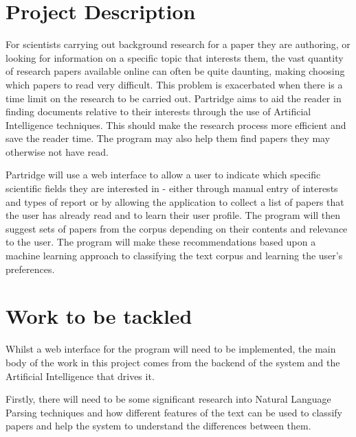 \documentclass[12pt,a4paper]{article}
\begin{document}



\setlength{\parindent}{0pt}
\setlength{\parskip}{1.5ex plus 0.5ex minus 0.2ex}


\pagebreak

\section{Project Description}

For scientists carrying out background research for a paper they are authoring, or looking for 
information on a specific topic that interests them, the vast quantity of
research papers available online can often be quite daunting, making 
choosing which papers to read very difficult. This problem
is exacerbated when there is a time limit on the research to be carried
out. Partridge aims to aid the reader in finding documents relative to their
interests through the use of Artificial Intelligence techniques. This should
make the research process more efficient and save the reader time. The program
may also help them find papers they may otherwise not have read.

Partridge will use a web interface to allow a user to indicate which
specific scientific fields they are interested in - either through manual entry
of interests and types of report or by allowing the application to collect a
list of papers that the user has already read and to learn their user profile.
The program will then suggest sets of papers from the corpus depending on their
contents and relevance to the user. The program will make these recommendations
based upon a machine learning approach to classifying the text corpus and
learning the user's preferences.

\section{Work to be tackled}
Whilst a web interface for the program will need to be implemented, the main
body of the work in this project comes from the backend of the system and the
Artificial Intelligence that drives it.

Firstly, there will need to be some significant research into Natural Language
Parsing techniques and how different features of the text can be used to
classify papers and help the system to understand the differences between them.
\end{document}
